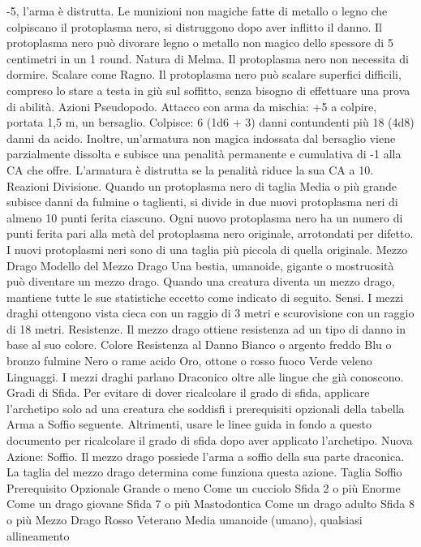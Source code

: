 \begin{multicols}{2}
-5, l’arma è distrutta. Le munizioni non magiche fatte di metallo o
legno che colpiscano il protoplasma nero, si distruggono dopo aver
inflitto il danno.
Il protoplasma nero può divorare legno o metallo non magico dello
spessore di 5 centimetri in un 1 round.
Natura di Melma. Il protoplasma nero non necessita di dormire.
Scalare come Ragno. Il protoplasma nero può scalare superfici
difficili, compreso lo stare a testa in giù sul soffitto, senza
bisogno di effettuare una prova di abilità.
Azioni
Pseudopodo. Attacco con arma da mischia: +5 a colpire, portata
1,5 m, un bersaglio.
Colpisce: 6 (1d6 + 3) danni contundenti più 18 (4d8) danni da
acido. Inoltre, un’armatura non magica indossata dal bersaglio
viene parzialmente dissolta e subisce una penalità permanente e
cumulativa di -1 alla CA che offre. L’armatura è distrutta se la
penalità riduce la sua CA a 10.
Reazioni
Divisione. Quando un protoplasma nero di taglia Media o più grande
subisce danni da fulmine o taglienti, si divide in due nuovi
protoplasma neri di almeno 10 punti ferita ciascuno. Ogni nuovo
protoplasma nero ha un numero di punti ferita pari alla metà del
protoplasma nero originale, arrotondati per difetto. I nuovi
protoplasmi neri sono di una taglia più piccola di quella originale.
Mezzo Drago
Modello del Mezzo Drago
Una bestia, umanoide, gigante o mostruosità può
diventare un mezzo drago. Quando una creatura
diventa un mezzo drago, mantiene tutte le sue
statistiche eccetto come indicato di seguito.
Sensi. I mezzi draghi ottengono vista cieca con un
raggio di 3 metri e scurovisione con un raggio di 18
metri.
Resistenze. Il mezzo drago ottiene resistenza ad un
tipo di danno in base al suo colore.
Colore Resistenza al Danno
Bianco o argento freddo
Blu o bronzo fulmine
Nero o rame acido
Oro, ottone o rosso fuoco
Verde veleno
Linguaggi. I mezzi draghi parlano Draconico oltre alle
lingue che già conoscono.
Gradi di Sfida. Per evitare di dover ricalcolare il grado
di sfida, applicare l’archetipo solo ad una creatura che
soddisfi i prerequisiti opzionali della tabella Arma a
Soffio seguente. Altrimenti, usare le linee guida in fondo
a questo documento per ricalcolare il grado di sfida
dopo aver applicato l’archetipo.
Nuova Azione: Soffio. Il mezzo drago possiede l’arma
a soffio della sua parte draconica. La taglia del mezzo
drago determina come funziona questa azione.
Taglia Soffio Prerequisito Opzionale
Grande o meno Come un cucciolo Sfida 2 o più
Enorme Come un drago giovane Sfida 7 o più
Mastodontica Come un drago adulto Sfida 8 o più
Mezzo Drago Rosso Veterano
Media umanoide (umano), qualsiasi allineamento

\end{multicols}
